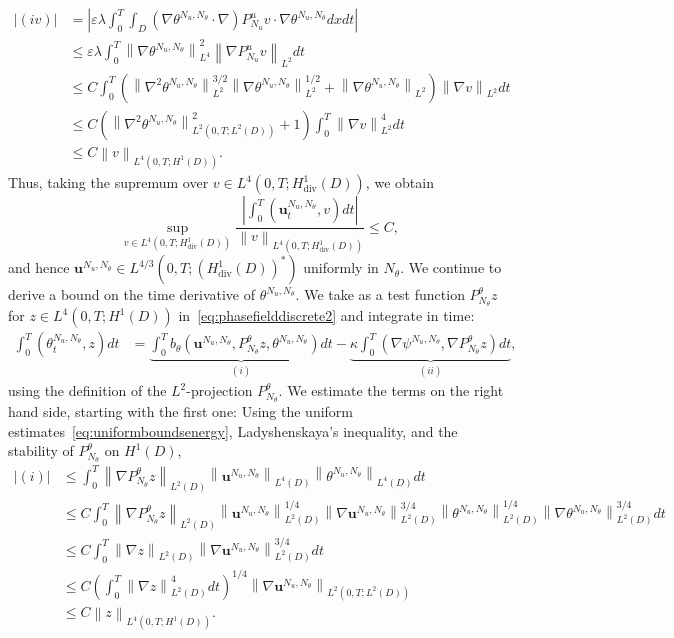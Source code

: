 \documentclass[10pt,letterpaper,twoside]{amsart}
\theoremstyle{definition}{\newtheorem{definition}[lemma]{Definition}}
\theoremstyle{note}{\newtheorem{claim}{Claim}[section]
\newtheorem*{claim*}{Claim}}
\numberwithin{equation}{section}
\newcommand{\dom}{D}
\newcommand{\norm}[1]{\left\| #1 \right\|}
\newcommand{\Grad}{\nabla}
\newcommand{\Div}{\operatorname{div}}
\newcommand{\V}{H^1_{\Div}(\dom)}
\newcommand{\bub}{\mathbf{u}^{N_u,N_\theta}}
\newcommand{\thb}{\theta^{N_u,N_\theta}}
\newcommand{\psib}{\psi^{N_u,N_\theta}}
\begin{document}
 \begin{align*}
 	|(iv)|& = \left|\varepsilon\lambda\int_0^T\int_{\dom} (\Grad\thb\cdot\Grad) P_{N_u}^u v \cdot \Grad\thb dx dt\right|\\
 	&\leq \varepsilon\lambda \int_0^T \norm{\Grad\thb}_{L^4}^2\norm{\Grad P^u_{N_u}v}_{L^2} dt\\
 	& \leq C \int_0^T \left( \norm{\Grad^2 \thb}_{L^2}^{3/2}\norm{\Grad\thb}_{L^2}^{1/2}+\norm{\Grad\thb}_{L^2}\right)\norm{\Grad v}_{L^2} dt\\
 	&  \leq C( \norm{\Grad^2 \thb}_{L^2(0,T;L^2(\dom))}^{2} +1)\int_0^T \norm{\Grad v}_{L^2}^{4}dt\\
 	& \leq C \norm{v}_{L^4(0,T;H^1(\dom))}.
 \end{align*}
 Thus, taking the supremum over $v\in L^4(0,T;\V)$, we obtain
 \begin{equation*}
 	\sup_{v\in L^4(0,T;\V)}\frac{ \left| \int_0^T (\bub_t,v) dt \right|}{\norm{v}_{L^4(0,T;\V)}} \leq C,
 \end{equation*}
 and hence $\bub\in L^{4/3}(0,T;(\V)^*)$ uniformly in  $N_\theta$. We continue to derive a bound on the time derivative of $\thb$.  We take as a test function $P^\theta_{N_\theta} z$ for $z\in L^4(0,T;H^1(\dom))$ in~\eqref{eq:phasefielddiscrete2} and integrate in time:
 \begin{align*}
 	\int_0^T(\thb_t,z ) dt &= \underbrace{\int_0^T b_\theta(\bub,P_{N_\theta}^\theta z,\thb) dt}_{(i)} -\underbrace{\kappa\int_0^T(\Grad\psib,\Grad P_{N_\theta}^\theta z) dt}_{(ii)},
 \end{align*}
 using the definition of the $L^2$-projection $P^\theta_{N_\theta}$. We estimate the terms on the right hand side, starting with the first one: Using the uniform estimates~\eqref{eq:uniformboundsenergy}, Ladyshenskaya's inequality, and the stability of $P^\theta_{N_\theta}$ on $H^1(\dom)$,
 \begin{align*}
 	|(i)|& \leq \int_0^T \norm{\Grad P_{N_\theta}^\theta z}_{L^2(\dom)}\norm{\bub}_{L^4(\dom)}\norm{\thb}_{L^4(\dom)}dt \\
 	&\leq C\int_0^T \norm{\Grad P_{N_\theta}^\theta z}_{L^2(\dom)}\norm{\bub}_{L^2(\dom)}^{1/4}\norm{\Grad\bub}_{L^2(\dom)}^{3/4}\norm{\thb}_{L^2(\dom)}^{1/4} \norm{\Grad \thb}_{L^2(\dom)}^{3/4}dt \\
 	&\leq C \int_0^T \norm{\Grad z}_{L^2(\dom)}\norm{\Grad\bub}_{L^2(\dom)}^{3/4} dt \\
 	&\leq C\left( \int_0^T \norm{\Grad z}_{L^2(\dom)}^4 dt\right)^{1/4} \norm{\Grad\bub}_{L^2(0,T;L^2(\dom))}\\
 	&\leq C \norm{z}_{L^4(0,T;H^1(\dom))}.
 \end{align*}
\end{document}
